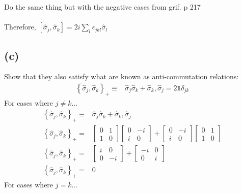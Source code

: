 \documentclass[12pt, a4paper]{article}
\begin{document}
Do the same thing but with the negative cases from grif. p 217\\
\\
Therefore, $\boxed{  \left[\hat{\sigma}_j,\hat{\sigma}_k\right] = 2i\sum_l \epsilon_{jkl}\hat{\sigma}_l }$



\subsection*{(c)} 
Show that they also satisfy what are known as anti-commutation relations:
\begin{align*}
\left\{\hat{\sigma}_j,\hat{\sigma}_k\right\}_+ \equiv& \hat{\sigma}_j \hat{\sigma}_k + \hat{\sigma}_k,\hat{\sigma}_j = 2\mathds{1}\delta_{jk}
\end{align*}
For cases where $j \neq k$...
\begin{align*}
\left\{\hat{\sigma}_j,\hat{\sigma}_k\right\}_+ \equiv& \hat{\sigma}_j \hat{\sigma}_k + \hat{\sigma}_k,\hat{\sigma}_j 
\\
\left\{\hat{\sigma}_j,\hat{\sigma}_k\right\}_+=& 
\begin{bmatrix}0&1\\1&0\end{bmatrix}
\begin{bmatrix}0&-i\\i&0\end{bmatrix} +
\begin{bmatrix}0&-i\\i&0\end{bmatrix}
\begin{bmatrix}0&1\\1&0\end{bmatrix}
\\
\left\{\hat{\sigma}_j,\hat{\sigma}_k\right\}_+=& 
\begin{bmatrix}i&0\\0&-i\end{bmatrix} +
\begin{bmatrix}-i&0\\0&i\end{bmatrix}
\\
\left\{\hat{\sigma}_j,\hat{\sigma}_k\right\}_+=& 0
\end{align*}
For cases where $j = k$...
\end{document}
